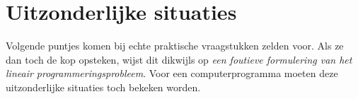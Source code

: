 %
%
%


\newpage
\section{Uitzonderlijke situaties}
Volgende puntjes komen bij echte praktische vraagstukken zelden
voor. Als ze dan toch de kop opsteken, wijst dit dikwijls op \emph{een
foutieve formulering van het lineair programmeringsprobleem}.
Voor een computerprogramma moeten deze uitzonderlijke situaties
toch bekeken worden.




